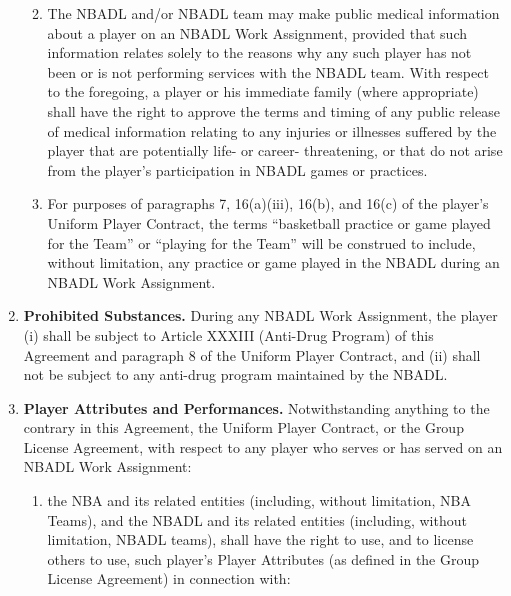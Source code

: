 \documentclass[
]{book}
\providecommand{\tightlist}{%
  \setlength{\itemsep}{0pt}\setlength{\parskip}{0pt}}
\begin{document}
\begin{enumerate}
  \begin{enumerate}
  \def\labelenumii{(\roman{enumii})}
  \tightlist
  \item
    The NBADL and/or NBADL team may make public medical information about a player on an NBADL Work Assignment, provided that such information relates solely to the reasons why any such player has not been or is not performing services with the NBADL team. With respect to the foregoing, a player or his immediate family (where appropriate) shall have the right to approve the terms and timing of any public release of medical information relating to any injuries or illnesses suffered by the player that are potentially life- or career- threatening, or that do not arise from the player's participation in NBADL games or practices.
  \item
    For purposes of paragraphs 7, 16(a)(iii), 16(b), and 16(c) of the player's Uniform Player Contract, the terms ``basketball practice or game played for the Team'' or ``playing for the Team'' will be construed to include, without limitation, any practice or game played in the NBADL during an NBADL Work Assignment.
  \end{enumerate}
\item
  \textbf{Prohibited Substances.} During any NBADL Work Assignment, the player (i) shall be subject to Article XXXIII (Anti-Drug Program) of this Agreement and paragraph 8 of the Uniform Player Contract, and (ii) shall not be subject to any anti-drug program maintained by the NBADL.
\item
  \textbf{Player Attributes and Performances.} Notwithstanding anything to the contrary in this Agreement, the Uniform Player Contract, or the Group License Agreement, with respect to any player who serves or has served on an NBADL Work Assignment:

  \begin{enumerate}
  \def\labelenumii{(\roman{enumii})}
  \tightlist
  \item
    the NBA and its related entities (including, without limitation, NBA Teams), and the NBADL and its related entities (including, without limitation, NBADL teams), shall have the right to use, and to license others to use, such player's Player Attributes (as defined in the Group License Agreement) in connection with:


\end{enumerate}
\end{enumerate}
\end{document}
